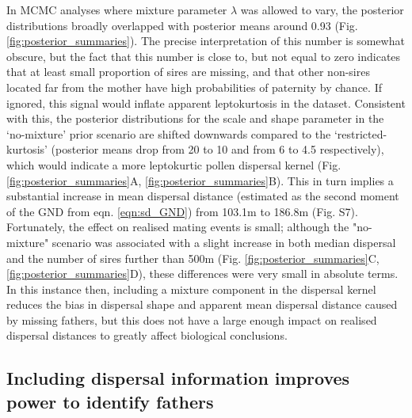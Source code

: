 \documentclass[10pt, a4paper, twocolumn]{article} %
\begin{document}
In MCMC analyses where mixture parameter $\lambda$ was allowed to vary, the posterior distributions broadly overlapped with posterior means around 0.93 (Fig. \ref{fig:posterior_summaries}).
The precise interpretation of this number is somewhat obscure, but the fact that this number is close to, but not equal to zero indicates that at least small proportion of sires are missing, and that other non-sires located far from the mother have high probabilities of paternity by chance.
If ignored, this signal would inflate apparent leptokurtosis in the dataset.
Consistent with this, the posterior distributions for the scale and shape parameter in the ‘no-mixture’ prior scenario are shifted downwards compared to the ‘restricted-kurtosis’ (posterior means drop from 20 to 10 and from 6 to 4.5 respectively), which would indicate a more leptokurtic pollen dispersal kernel (Fig. \ref{fig:posterior_summaries}A, \ref{fig:posterior_summaries}B).
This in turn implies a substantial increase in mean dispersal distance (estimated as the second moment of the GND from eqn. \ref{eqn:sd_GND}) from 103.1m to 186.8m (Fig. S7).
Fortunately, the effect on realised mating events is small; although the "no-mixture" scenario was associated with a slight increase in both median dispersal and the number of sires further than 500m (Fig. \ref{fig:posterior_summaries}C, \ref{fig:posterior_summaries}D), these differences were very small in absolute terms.
In this instance then, including a mixture component in the dispersal kernel reduces the bias in dispersal shape and apparent mean dispersal distance caused by missing fathers, but this does not have a large enough impact on realised dispersal distances to greatly affect biological conclusions.

\subsection{Including dispersal information improves power to identify fathers}
\end{document}
